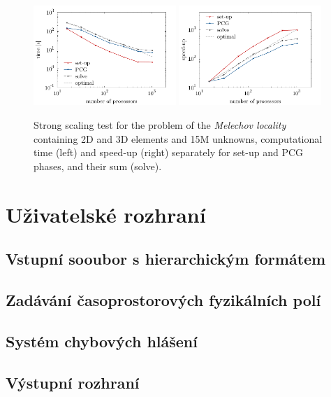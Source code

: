 \documentclass[11pt]{report}
\begin{document}
\begin{figure}[h]
\begin{center}
\includegraphics[width=0.48\textwidth]{timing_melechov_large} 
\includegraphics[width=0.48\textwidth]{speedup_melechov_large}
\end{center}
\caption{\label{fig:timing_Melechov_large}
Strong scaling test for the problem of the \emph{Melechov locality}
containing 2D and 3D elements and 15M unknowns, computational time (left) and
speed-up (right) separately for set-up and PCG phases, and their sum (solve).}
\end{figure}


\section{Uživatelské rozhraní}
\subsection{Vstupní sooubor s hierarchickým formátem}
\subsection{Zadávání časoprostorových fyzikálních polí}
\subsection{Systém chybových hlášení}
\subsection{Výstupní rozhraní}
\end{document}
